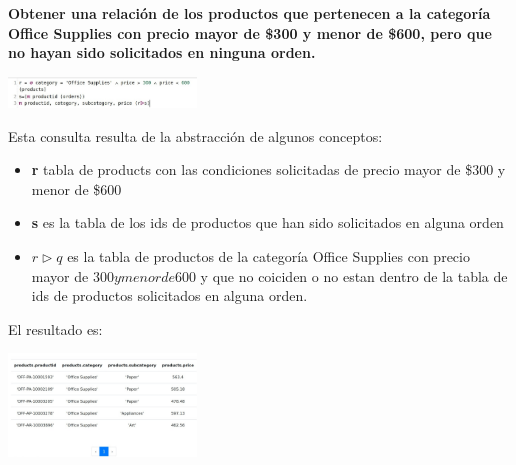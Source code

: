 \textbf{Obtener una relación de los productos que pertenecen a la categoría Office Supplies con precio mayor de \$300 y menor de \$600, pero que no hayan sido solicitados en ninguna orden.} \vspace{.3cm}

\begin{center}
    \includegraphics[width=5cm]{resources/pregunta2/2.2.1}
\end{center}

Esta consulta resulta de la abstracción de algunos conceptos:
\begin{itemize}
    \item \textbf{r} tabla de products con las condiciones solicitadas de precio mayor de \$300 y menor de \$600
    \item  \textbf{s} es la tabla de los ids de productos que han sido solicitados en alguna orden
    \item  \textbf{$r \vartriangleright q$} es la tabla de productos de la categoría Office Supplies con precio mayor de $300 y menor de $600 y que no coiciden o no estan dentro de la tabla de ids de productos solicitados en alguna orden.
\end{itemize}

El resultado es:

\begin{center}
    \includegraphics[width=5cm]{resources/pregunta2/2.2.2}
\end{center}

